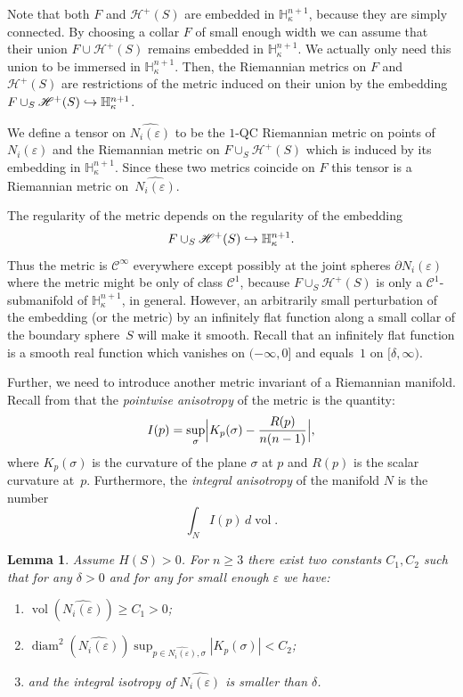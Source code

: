 \documentclass[10pt]{amsart}
\let\mathcal\mathscr
\DeclareMathOperator{\diam}{diam}
\DeclareMathOperator{\vol}{vol}
\newcommand\hto{\mathrel{\lhook\joinrel\to}}
\newtheorem{lemma}[theorem]{Lemma}
\theoremstyle{definition}
\theoremstyle{remark}
\numberwithin{equation}{section}
\begin{document}
Note that both $F$ and $\mathcal H^+(S)$ are embedded
in $\mathbb H_{\kappa}^{n+1}$, because they are simply connected. By choosing a collar $F$ of small enough width
we can assume that their union $F\cup \mathcal H^+(S)$ remains embedded in $\mathbb H_{\kappa}^{n+1}$. We actually only need
this union to be immersed in $\mathbb H_{\kappa}^{n+1}$. Then, the Riemannian metrics on $F$ and $\mathcal H^+(S)$
are restrictions of the metric induced on their union by the embedding
$F\cup_S \mathcal H^+(S)\hto \mathbb H_{\kappa}^{n+1}$.

We define a tensor on $\widehat{N_i(\varepsilon)}$ to be the $1$-QC Riemannian metric on points of
$N_i(\varepsilon)$ and the Riemannian metric on $F\cup_S \mathcal H^+(S)$ which is induced by its embedding in $\mathbb H_{\kappa}^{n+1}$.
Since these two metrics coincide on $F$ this tensor is a Riemannian metric on~$\widehat{N_i(\varepsilon)}$.

The regularity of the metric depends on the regularity of the embedding $$F\cup_S \mathcal H^+(S)\hto \mathbb H_{\kappa}^{n+1}.$$ Thus the metric is $\mathcal C^{\infty}$ everywhere except possibly at the joint spheres
$\partial N_i(\varepsilon)$ where the metric might be only of class $\mathcal C^1$, because
$F\cup_S \mathcal H^+(S)$ is only a $\mathcal C^1$-submanifold of $\mathbb H_{\kappa}^{n+1}$, in general.
However, an arbitrarily small perturbation of the embedding (or the metric)
by an infinitely flat function along a small collar of the boundary sphere~$S$ will make it smooth. Recall that an infinitely flat
function is a smooth real function which vanishes on $(-\infty, 0]$ and equals~$1$ on $[\delta, \infty)$.

Further, we need to introduce another metric invariant of a
Riemannian manifold. Recall from \cite{Nik} that the
\emph{pointwise anisotropy} of the metric is the quantity:
\[I(p)=\sup_{\sigma} \Bigl|K_p(\sigma)- \frac{R(p)}{n(n-1)}\Bigr|,\]
where $K_p(\sigma)$ is the curvature of the plane $\sigma$ at $p$
and $R(p)$ is the scalar curvature at~$p$. Furthermore, the
\emph{integral anisotropy} of the manifold $N$ is the number
\[\int_NI(p)\, d\vol.\]

\begin{lemma}\label{niko}
Assume $H(S) >0$.
For $n\geq3$ there exist two constants $C_1,C_2$ such that for any $\delta >0$
and for any for small enough $\varepsilon$ we have:
\begin{enumerate}
\item $\vol(\widehat{N_i(\varepsilon)}) \geq C_1 >0$;
\item $\diam^2(\widehat{N_i(\varepsilon)})\sup_{p\in \widehat{N_i(\varepsilon)}, \sigma}|K_p(\sigma)| < C_2$;
\item and the integral isotropy of $\widehat{N_i(\varepsilon)}$ is smaller than $\delta$.
\end{enumerate}
\end{lemma}
\end{document}
